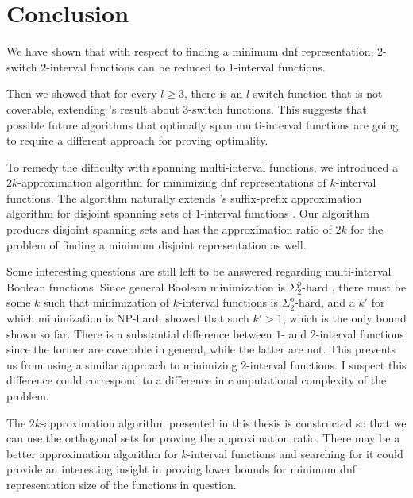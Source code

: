 \chapter*{Conclusion}


We have shown that
with respect to finding
a minimum \acrshort{dnf} representation,
$2$-switch $2$-interval functions
can be reduced to $1$-interval functions.

Then we showed that for every $l \geq 3$,
there is an $l$-switch function that is not coverable,
extending \citeauthor{Dubovsky2012}'s result
about $3$-switch functions.
This suggests that possible future algorithms
that optimally span multi-interval functions
are going to require a different approach
for proving optimality.

To remedy the difficulty with spanning multi-interval
functions,
we introduced a $2k$-approximation algorithm
for minimizing \acrshort{dnf} representations
of $k$-interval functions.
The algorithm naturally extends
\citeauthor{Schieber2005154}'s suffix-prefix
approximation algorithm
for disjoint spanning sets of $1$-interval functions
\citep[section 6]{Schieber2005154}.
Our algorithm produces disjoint spanning sets
and has the approximation ratio of $2k$
for the problem of finding
a minimum disjoint representation as well.

Some interesting questions are still left to be answered
regarding multi-interval Boolean functions.
Since general Boolean minimization is
$\Sigma_2^p$-hard \citep{Umans1998},
there must
be some $k$ such that minimization
of $k$-interval functions is $\Sigma_2^p$-hard,
and a $k'$ for which minimization is NP-hard.
\citeauthor{Schieber2005154} showed that such $k' > 1$,
which is the only bound shown so far.
There is a substantial difference
between $1$- and $2$-interval functions
since the former are coverable in general,
while the latter are not.
This prevents us from using a similar approach
to minimizing $2$-interval functions.
I suspect this difference could correspond to
a difference in computational complexity of the problem.

The $2k$-approximation algorithm presented in this thesis
is constructed so that we can use the orthogonal sets
for proving the approximation ratio.
There may be a better approximation algorithm
for $k$-interval functions
and searching for it could provide an interesting insight
in proving lower bounds for minimum \acrshort{dnf}
representation size of the functions in question.
